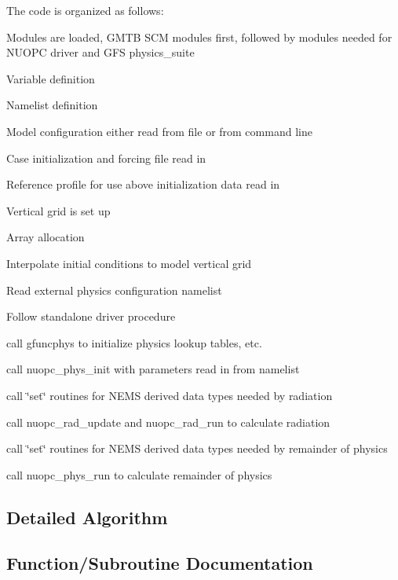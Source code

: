 The code is organized as follows\+:
\begin{DoxyItemize}
\item Modules are loaded, G\+M\+TB S\+CM modules first, followed by modules needed for N\+U\+O\+PC driver and G\+FS physics\+\_\+suite
\item Variable definition
\item Namelist definition
\item Model configuration either read from file or from command line
\item Case initialization and forcing file read in
\item Reference profile for use above initialization data read in
\item Vertical grid is set up
\item Array allocation
\item Interpolate initial conditions to model vertical grid
\item Read external physics configuration namelist
\item Follow standalone driver procedure
\begin{DoxyItemize}
\item call gfuncphys to initialize physics lookup tables, etc.
\item call nuopc\+\_\+phys\+\_\+init with parameters read in from namelist
\item call \char`\"{}set\char`\"{} routines for N\+E\+MS derived data types needed by radiation
\item call nuopc\+\_\+rad\+\_\+update and nuopc\+\_\+rad\+\_\+run to calculate radiation
\item call \char`\"{}set\char`\"{} routines for N\+E\+MS derived data types needed by remainder of physics
\item call nuopc\+\_\+phys\+\_\+run to calculate remainder of physics 
\end{DoxyItemize}
\end{DoxyItemize}\hypertarget{group__input_detailed}{}\subsection{Detailed Algorithm}\label{group__input_detailed}


\subsection{Function/\+Subroutine Documentation}
